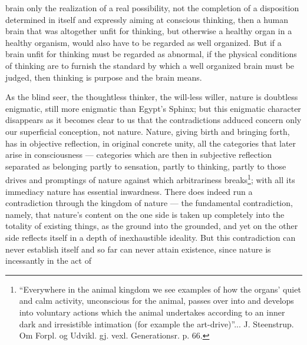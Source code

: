 \documentclass[12pt,a4paper]{book}
\begin{document}
\setcounter{footnote}{0}
brain only the realization of a real possibility, not the completion of a
disposition determined in itself and expressly aiming at conscious thinking, then
a human brain that was altogether unfit for thinking, but otherwise a healthy
organ in a healthy organism, would also have to be regarded as well organized.
But if a brain unfit for thinking must be regarded as abnormal, if the physical
conditions of thinking are to furnish the standard by which a well organized
brain must be judged, then thinking is purpose and the brain means.

As the blind seer, the thoughtless thinker, the will-less willer, nature is
doubtless enigmatic, still more enigmatic than Egypt's Sphinx; but this enigmatic
character disappears as it becomes clear to us that the contradictions adduced
concern only our superficial conception, not nature. Nature, giving birth and
bringing forth, has in objective reflection, in original concrete unity, all the
categories that later arise in consciousness --- categories which are then in
subjective reflection separated as belonging partly to sensation, partly to
thinking, partly to those drives and promptings of nature against which
arbitrariness breaks\footnote{``Everywhere in the animal kingdom we see examples
of how the organs' quiet and calm activity, unconscious for the animal, passes
over into and develops into voluntary actions which the animal undertakes
according to an inner dark and irresistible intimation (for example the
art-drive)''... J. Steenstrup. Om Forpl. og Udvikl. gj. vexl. Generationsr.
p. 66.}; with all its immediacy nature has essential inwardness. There does
indeed run a contradiction through the kingdom of nature --- the fundamental
contradiction, namely, that nature's content on the one side is taken up
completely into the totality of existing things, as the ground into the
grounded, and yet on the other side reflects itself in a depth of inexhaustible
ideality. But this contradiction can never establish itself and so far can never
attain existence, since nature is incessantly in the act of
\end{document}
